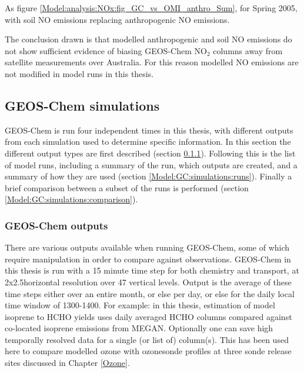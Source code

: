     {As figure \ref{Model:analysis:NOx:fig_GC_vs_OMI_anthro_Sum}, for Spring 2005, with soil NO emissions replacing anthropogenic NO emissions.}
    {\label{Model:analysis:NOx:fig_GC_vs_OMI_soil_Spr}}
    
    The conclusion drawn is that modelled anthropogenic and soil NO emissions do not show sufficient evidence of biasing GEOS-Chem NO$_2$ columns away from satellite measurements over Australia.
    For this reason modelled NO emissions are not modified in model runs in this thesis.
  

  \subsection{GEOS-Chem simulations}
    \label{Model:GC:simulations}
    
    GEOS-Chem is run four independent times in this thesis, with different outputs from each simulation used to determine specific information. 
    In this section the different output types are first described (section \ref{Model:GC:simulations:outputs}).
    Following this is the list of model runs, including a summary of the run, which outputs are created, and a summary of how they are used (section \ref{Model:GC:simulations:runs}).
    Finally a brief comparison between a subset of the runs is performed (section \ref{Model:GC:simulations:comparison}).
    
    \subsubsection{GEOS-Chem outputs}
      \label{Model:GC:simulations:outputs}
      There are various outputs available when running GEOS-Chem, some of which require manipulation in order to compare against observations.
      GEOS-Chem in this thesis is run with a 15 minute time step for both chemistry and transport, at 2x2.5\degr horizontal resolution over 47 vertical levels.
      Output is the average of these time steps either over an entire month, or else per day, or else for the daily local time window of 1300-1400.
      For example: in this thesis, estimation of model isoprene to HCHO yields uses daily averaged HCHO columns compared against co-located isoprene emissions from MEGAN.
      Optionally one can save high temporally resolved data for a single (or list of) column(s).
      This has been used here to compare modelled ozone with ozonesonde profiles at three sonde release sites discussed in Chapter \ref{Ozone}.
      

